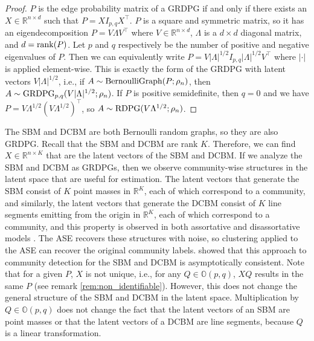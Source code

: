 \documentclass[
  12pt,
]{article}
\theoremstyle{definition}
\theoremstyle{definition}
\theoremstyle{definition}
\theoremstyle{definition}
\theoremstyle{remark}
\begin{document}
\begin{proof}
$P$ is the edge probability matrix of a GRDPG if and only if there exists an $X \in \mathbb{R}^{n \times d}$ such that $P = X I_{p,q} X^\top$. 
$P$ is a square and symmetric matrix, so it has an eigendecomposition $P = V \Lambda V^\top$ where $V \in \mathbb{R}^{n \times d}$, $\Lambda$ is a $d \times d$ diagonal matrix, and $d = \mathrm{rank}(P)$. 
Let $p$ and $q$ respectively be the number of positive and negative eigenvalues of $P$. 
Then we can equivalently write $P = V |\Lambda|^{1/2} I_{p,q} |\Lambda|^{1/2} V^\top$ where $|\cdot|$ is applied element-wise. 
This is exactly the form of the GRDPG with latent vectors $V |\Lambda|^{1/2}$,
i.e., if $A \sim \mathrm{BernoulliGraph}(P; \rho_n)$, then $A \sim \mathrm{GRDPG}_{p,q}(V |\Lambda|^{1/2}; \rho_n)$. 
If $P$ is positive semidefinite, then $q = 0$ and we have $P = V \Lambda^{1/2} (V \Lambda^{1/2})^\top$, so $A \sim \mathrm{RDPG}(V \Lambda^{1/2}; \rho_n)$. 
\end{proof}

The SBM and DCBM are both Bernoulli random graphs, so they are also GRDPG.
Recall that the SBM and DCBM are rank \(K\).
Therefore, we can find \(X \in \mathbb{R}^{n \times K}\) that are the latent vectors of the SBM and DCBM.
If we analyze the SBM and DCBM as GRDPGs, then we observe community-wise structures in the latent space that are useful for estimation.
The latent vectors that generate the SBM consist of \(K\) point masses in \(\mathbb{R}^K\), each of which correspond to a community, and similarly, the latent vectors that generate the DCBM consist of \(K\) line segments emitting from the origin in \(\mathbb{R}^K\), each of which correspond to a community, and this property is observed in both assortative and disassortative models \citep{rubindelanchy2017statistical}.
The ASE recovers these structures with noise, so clustering applied to the ASE can recover the original community labels.
\citet{rubindelanchy2017statistical} showed that this approach to community detection for the SBM and DCBM is asymptotically consistent.
Note that for a given \(P\), \(X\) is not unique, i.e., for any \(Q \in \mathbb{O}(p, q)\), \(X Q\) results in the same \(P\) (see remark \ref{rem:non_identifiable}).
However, this does not change the general structure of the SBM and DCBM in the latent space.
Multiplication by \(Q \in \mathbb{O}(p,q)\) does not change the fact that the latent vectors of an SBM are point masses or that the latent vectors of a DCBM are line segments, because \(Q\) is a linear transformation.
\end{document}
